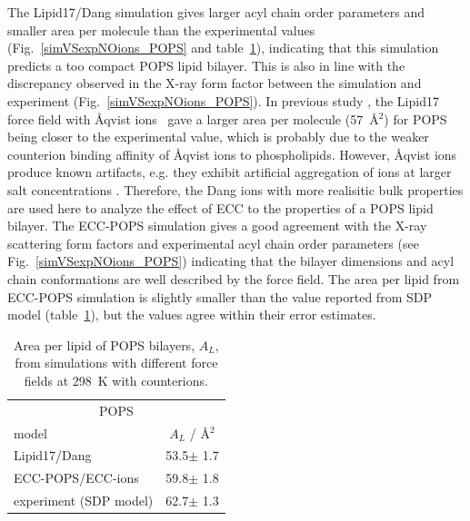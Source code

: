 \documentclass[journal=jpcbfk,manuscript=article]{achemso}
\begin{document}
The Lipid17/Dang simulation gives larger acyl chain order parameters and smaller area per molecule than the
experimental values (Fig.~\ref{simVSexpNOions_POPS} and table~\ref{tab:apls}),
indicating that this simulation predicts a too compact POPS lipid bilayer. This is also in line with
the discrepancy observed in the X-ray form factor between the simulation and experiment (Fig.~\ref{simVSexpNOions_POPS}).
In previous study \cite{NMRlipidsIV}, the Lipid17 force field with {\AA}qvist ions~\cite{aqvist90}
gave a larger area per molecule (57~\AA$^2$) for POPS being closer to the experimental value,
which is probably due to the weaker counterion binding affinity of {\AA}qvist ions to phospholipids. \cite{catte16, NMRlipidsIV}
However,  {\AA}qvist ions produce known artifacts, 
e.g. they exhibit artificial aggregation of ions at larger salt concentrations \cite{kohagen16, chen07, NMRlipidsIV}.
Therefore, the Dang ions with more realisitic bulk properties are used here to analyze the effect of ECC to the properties of a POPS lipid bilayer. 
The ECC-POPS simulation gives a good agreement with the X-ray scattering form factors and experimental
acyl chain order parameters (see Fig.~\ref{simVSexpNOions_POPS}) indicating that the bilayer dimensions and acyl chain
conformations are well described by the force field. The area per lipid from ECC-POPS simulation is slightly
smaller than the value reported from SDP model \cite{kucerka14} (table~\ref{tab:apls}), but the values
agree within their error estimates. 



\begin{table}[tb!] 
\centering
  \caption{Area per lipid of POPS bilayers, $A_L$, from simulations with different force fields at 298~K with  counterions. \label{tab:apls} } 
  \begin{tabular}{l|c } 
    \multicolumn{2}{c}{POPS} \\
    model          & $A_L$ / Å$^2$    \\ 
    \hline 
    Lipid17/Dang              & 53.5$\pm$ 1.7   \\ 
    ECC-POPS/ECC-ions         & 59.8$\pm$ 1.8   \\ 
    experiment (SDP model) \citep{kucerka14} & 62.7$\pm$ 1.3  \\ 
  \end{tabular} \\
\end{table} 
\end{document}
